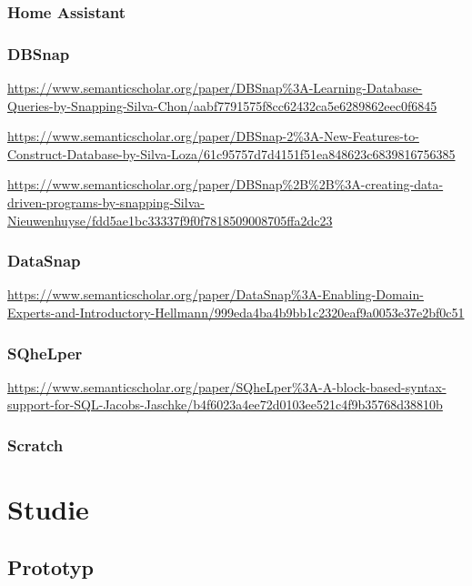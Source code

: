\documentclass[oneside,a4paper,11pt,openright]{scrreprt}
\begin{document}
\clearpage



% 



\clearpage

\subsection{Home Assistant}
\subsection{DBSnap}
\parencite{silvaDBSnapLearning2015}
\url{https://www.semanticscholar.org/paper/DBSnap\%3A-Learning-Database-Queries-by-Snapping-Silva-Chon/aabf7791575f8cc62432ca5e6289862eec0f6845}

\url{https://www.semanticscholar.org/paper/DBSnap-2\%3A-New-Features-to-Construct-Database-by-Silva-Loza/61c95757d7d4151f51ea848623c6839816756385}

\url{https://www.semanticscholar.org/paper/DBSnap\%2B\%2B\%3A-creating-data-driven-programs-by-snapping-Silva-Nieuwenhuyse/fdd5ae1bc33337f9f0f7818509008705ffa2dc23}

\subsection{DataSnap}
\parencite{hellmannDataSnapEnabling2015}
\url{https://www.semanticscholar.org/paper/DataSnap\%3A-Enabling-Domain-Experts-and-Introductory-Hellmann/999eda4ba4b9bb1c2320eaf9a0053e37e2bf0c51}

\subsection{SQheLper}
\parencite{jacobsSQheLperBlockbased2021}
\url{https://www.semanticscholar.org/paper/SQheLper\%3A-A-block-based-syntax-support-for-SQL-Jacobs-Jaschke/b4f6023a4ee72d0103ee521c4f9b35768d38810b}
\subsection{Scratch}


\chapter{Studie}
\section{Prototyp}
\end{document}
